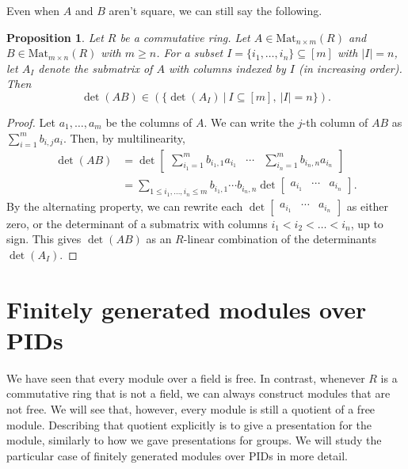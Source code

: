 \documentclass[12pt]{report}
\newtheorem{proposition}[theorem]{Proposition}
\numberwithin{equation}{section}
\numberwithin{theorem}{chapter}
\theoremstyle{definition}
\newtheorem*{basic properties}{Basic Properties}
\newtheorem*{Important Remark}{Important Remark}
\begin{document}
Even when $A$ and $B$ aren't square, we can still say the following.

\begin{proposition}
Let $R$ be a commutative ring. Let $A\in \mathrm{Mat}_{n\times m}(R)$ and $B\in \mathrm{Mat}_{m\times n}(R)$ with $m\geq n$. For a subset $I=\{i_1,\dots,i_n\} \subseteq [m]$ with $|I|=n$, let $A_I$ denote the submatrix of $A$ with columns indexed by $I$ (in increasing order). Then \[ \det(AB) \in ( \{ \det(A_I) \ | \ I\subseteq [m] , \ |I|=n\}).\]
\end{proposition}

\begin{proof} Let $a_1,\dots,a_m$ be the columns of $A$. We can write the $j$-th column of $AB$ as
$\sum_{i=1}^m b_{i,j} a_i$. Then, by multilinearity,
\[\begin{aligned} \det(AB) &= \det \begin{bmatrix} \sum_{i_1=1}^m b_{i_1,1} a_{i_1} & \cdots & \sum_{i_n=1}^m b_{i_n,n} a_{i_n} \end{bmatrix} \\&= \sum_{1\leq i_1,\dots,i_n \leq m} b_{i_1,1} \cdots b_{i_n,n} \det\begin{bmatrix} a_{i_1} & \cdots & a_{i_n} \end{bmatrix}.\end{aligned}\]
By the alternating property, we can rewrite each $\det\begin{bmatrix} a_{i_1} & \cdots & a_{i_n} \end{bmatrix}$ as either zero, or the determinant of a submatrix with columns $i_1<i_2<\dots<i_n$, up to sign. This gives $\det(AB)$ as an $R$-linear combination of the determinants $\det(A_I)$.
\end{proof}

\chapter{Finitely generated modules over PIDs}

We have seen that every module over a field is free. In contrast, whenever $R$ is a commutative ring that is not a field, we can always construct modules that are not free. We will see that, however, every module is still a quotient of a free module. Describing that quotient explicitly is to give a presentation for the module, similarly to how we gave presentations for groups. We will study the particular case of finitely generated modules over PIDs in more detail.
\end{document}
